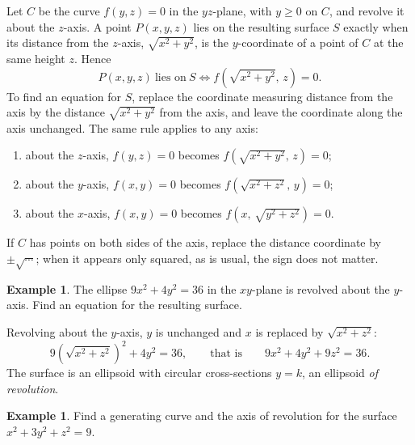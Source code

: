 \documentclass[11pt,a4paper]{article}
\theoremstyle{definition}
\newtheorem{exa}[thm]{Example}
\begin{document}
Let $C$ be the curve $f(y,z) = 0$ in the $yz$-plane, with $y\geq 0$ on $C$, and
revolve it about the $z$-axis. A point $P(x,y,z)$ lies on the resulting surface
$S$ exactly when its distance from the $z$-axis, $\sqrt{x^2 + y^2}$, is the
$y$-coordinate of a point of $C$ at the same height $z$. Hence
\[P(x,y,z)\ \text{lies on}\ S \iff f\left(\sqrt{x^2 + y^2},\, z\right) = 0 .\]
To find an equation for $S$, replace the coordinate measuring distance from the
axis by the distance $\sqrt{x^2 + y^2}$ from the axis, and leave the coordinate
along the axis unchanged. The same rule applies to any axis:
\begin{enumerate}
\item[$-$] about the $z$-axis, $f(y,z) = 0$ becomes
$f\left(\sqrt{x^2+y^2},\,z\right) = 0$;
\item[$-$] about the $y$-axis, $f(x,y) = 0$ becomes
$f\left(\sqrt{x^2+z^2},\,y\right) = 0$;
\item[$-$] about the $x$-axis, $f(x,y) = 0$ becomes
$f\left(x,\,\sqrt{y^2+z^2}\right) = 0$.
\end{enumerate}
If $C$ has points on both sides of the axis, replace the distance coordinate by
$\pm\sqrt{\cdots}$; when it appears only squared, as is usual, the sign does not
matter.

\begin{exa}
\label{ex:revolveellipse}
The ellipse $9x^2 + 4y^2 = 36$ in the $xy$-plane is revolved about the $y$-axis.
Find an equation for the resulting surface.

\begin{figure}[H]
\centering
{}
\end{figure}

Revolving about the $y$-axis, $y$ is unchanged and $x$ is replaced by
$\sqrt{x^2 + z^2}$:
\[9\left(\sqrt{x^2 + z^2}\right)^2 + 4y^2 = 36,\qquad\text{that is}\qquad 9x^2 +
4y^2 + 9z^2 = 36 .\]
The surface is an ellipsoid with circular cross-sections $y = k$, an ellipsoid
\emph{of revolution}.
\end{exa}

\begin{exa}
\label{ex:generating}
Find a generating curve and the axis of revolution for the surface
$x^2 + 3y^2 + z^2 = 9$.
\end{exa}
\end{document}
